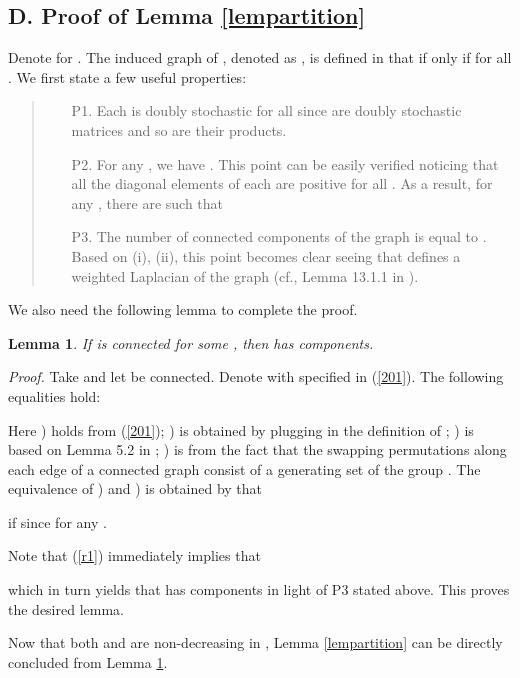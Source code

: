 \documentclass[a4paper, 11pt]{article}
\newtheorem{lemma}{Lemma}
\begin{document}
\subsection*{D. Proof of Lemma \ref{lempartition}}
Denote  for . The induced graph of , denoted as , is defined in that
 if only if  for all . We first state a few useful properties:
\begin{quote}
\begin{itemize}
\item[P1.]  Each  is doubly stochastic  for all  since  are doubly stochastic matrices and so are their products.
\item[P2.] For any ,  we have . This point can be easily verified  noticing that all the diagonal elements of each  are positive for all . As a result, for any , there are  such that
    
    \item[P3.] The number of connected components of the graph  is equal to . Based on (i), (ii), this point becomes clear seeing that  defines a weighted Laplacian of the graph  (cf., Lemma 13.1.1 in \cite{GraphTheory}).
\end{itemize}
\end{quote}

We also need the following lemma to complete the proof.

\medskip

\begin{lemma}\label{lemgraph}
If  is connected for some , then  has  components.
\end{lemma}


{\it Proof.} Take  and let   be connected.  Denote  with  specified in (\ref{201}). The following equalities hold:

Here ) holds from (\ref{201}); ) is obtained by plugging in the definition of ;  ) is based on   Lemma 5.2 in \cite{PRAinformation}; ) is from the fact that the swapping permutations along each edge of a connected graph  consist of a generating set of the group . The equivalence of ) and ) is obtained by that

if  since  for any .

Note that (\ref{r1}) immediately  implies that

which in turn  yields that  has  components in light of P3 stated above. This proves the desired lemma. \hfill


Now that  both  and  are non-decreasing in , Lemma \ref{lempartition} can be directly concluded from Lemma \ref{lemgraph}.
\end{document}
